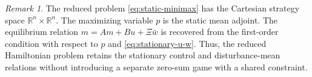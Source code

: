 \documentclass[10pt,journal,twoside]{IEEEtran}
\theoremstyle{definition}
\theoremstyle{remark}
\newtheorem{remark}{Remark}
\begin{document}

\begin{remark}
The reduced problem \eqref{eq:static-minimax} has the Cartesian
strategy space \(\mathbb R^n\times\mathbb R^n\). The maximizing variable
\(p\) is the static mean adjoint. The equilibrium relation
\(m=Am+Bu+\Xi\bar w\) is recovered from the first-order condition with
respect to \(p\) and \eqref{eq:stationary-u-w}. Thus, the reduced
Hamiltonian problem retains the stationary control and disturbance-mean
relations without introducing a separate zero-sum game with a shared
constraint.
\end{remark}
\end{document}
